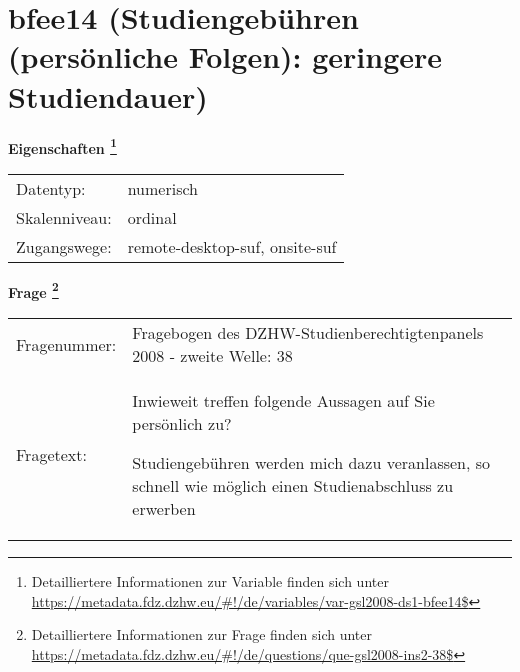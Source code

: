 
    \setcounter{footnote}{0}

    \vspace*{-1.8cm}
	\section{bfee14 (Studiengebühren (persönliche Folgen): geringere Studiendauer)}
	\label{section:bfee14}



    \vspace*{0.5cm}
    \noindent\textbf{Eigenschaften
	\footnote{Detailliertere Informationen zur Variable finden sich unter
		\url{https://metadata.fdz.dzhw.eu/\#!/de/variables/var-gsl2008-ds1-bfee14$}}}\\
	\begin{tabularx}{\hsize}{@{}lX}
	Datentyp: & numerisch \\
	Skalenniveau: & ordinal \\
	Zugangswege: &
	  remote-desktop-suf, 
	  onsite-suf
 \\
    \end{tabularx}



				\vspace*{0.5cm}
                \noindent\textbf{Frage
	                \footnote{Detailliertere Informationen zur Frage finden sich unter
		              \url{https://metadata.fdz.dzhw.eu/\#!/de/questions/que-gsl2008-ins2-38$}}}\\
				\begin{tabularx}{\hsize}{@{}lX}
					Fragenummer: &
					  Fragebogen des DZHW-Studienberechtigtenpanels 2008 - zweite Welle:
					  38
 \\
					Fragetext: & Inwieweit treffen folgende Aussagen auf Sie persönlich zu?\par  Studiengebühren werden mich dazu veranlassen, so schnell wie möglich einen Studienabschluss zu erwerben \\
				\end{tabularx}






